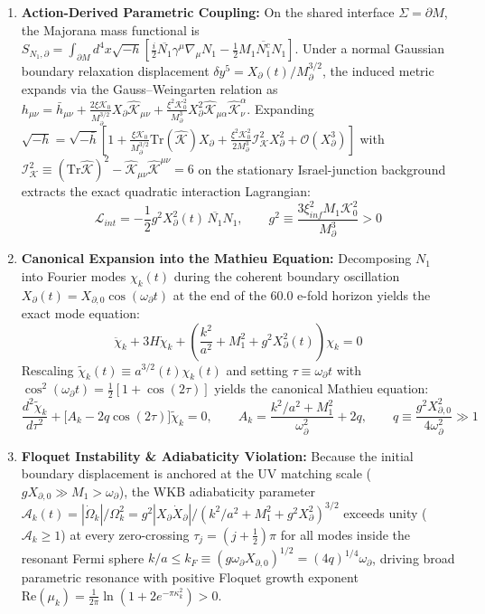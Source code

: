 \documentclass[aps,prd,onecolumn,superscriptaddress,nofootinbib,longbibliography,10pt]{revtex4-2}
\begin{document}
\begin{enumerate}
  
\item \textbf{Action-Derived Parametric Coupling:} On the shared interface \(\Sigma = \partial M\), the Majorana mass functional is \(S_{N_1,\partial} = \int_{\partial M} d^4x\sqrt{-h}\left[\frac{i}{2}\overline{N_1}\gamma^\mu\nabla_\mu N_1 - \frac{1}{2}M_1\overline{N_1^c}N_1\right]\). Under a normal Gaussian boundary relaxation displacement \(\delta y^5 = X_{\partial}(t)/M_{\partial}^{3/2}\), the induced metric expands via the Gauss–Weingarten relation as \(h_{\mu\nu} = \bar{h}_{\mu\nu} + \frac{2\xi\mathcal{K}_0}{M_{\partial}^{3/2}}X_{\partial}\hat{\mathcal{K}}_{\mu\nu} + \frac{\xi^2\mathcal{K}_0^2}{M_{\partial}^3}X_{\partial}^2\hat{\mathcal{K}}_{\mu\alpha}\hat{\mathcal{K}}_\nu^\alpha\). Expanding \(\sqrt{-h} = \sqrt{-\bar{h}}\left[1 + \frac{\xi\mathcal{K}_0}{M_{\partial}^{3/2}}\text{Tr}(\hat{\mathcal{K}})X_{\partial} + \frac{\xi^2\mathcal{K}_0^2}{2M_{\partial}^3}\mathcal{I}_{\mathcal{K}}^2 X_{\partial}^2 + \mathcal{O}(X_{\partial}^3)\right]\) with \(\mathcal{I}_{\mathcal{K}}^2 \equiv (\text{Tr}\hat{\mathcal{K}})^2 - \hat{\mathcal{K}}_{\mu\nu}\hat{\mathcal{K}}^{\mu\nu} = 6\) on the stationary Israel-junction background extracts the exact quadratic interaction Lagrangian:
  \[\mathcal{L}_{int} = -\frac{1}{2}g^2 X_{\partial}^2(t)\,\overline{N_1}N_1, \qquad g^2 \equiv \frac{3\xi_{inf}^2 M_1 \mathcal{K}_0^2}{M_{\partial}^3} > 0\]
  
\item \textbf{Canonical Expansion into the Mathieu Equation:} Decomposing \(N_1\) into Fourier modes \(\chi_k(t)\) during the coherent boundary oscillation \(X_{\partial}(t) = X_{\partial,0}\cos(\omega_{\partial} t)\) at the end of the \(60.0\) e-fold horizon yields the exact mode equation:
  \[\ddot{\chi}_k + 3H\dot{\chi}_k + \left(\frac{k^2}{a^2} + M_1^2 + g^2 X_{\partial}^2(t)\right)\chi_k = 0\]
  Rescaling \(\widetilde{\chi}_k(t) \equiv a^{3/2}(t)\chi_k(t)\) and setting \(\tau \equiv \omega_{\partial} t\) with \(\cos^2(\omega_{\partial} t) = \frac{1}{2}[1 + \cos(2\tau)]\) yields the canonical Mathieu equation:
  \[\frac{d^2\widetilde{\chi}_k}{d\tau^2} + \Big[A_k - 2q\cos(2\tau)\Big]\widetilde{\chi}_k = 0, \qquad A_k = \frac{k^2/a^2 + M_1^2}{\omega_{\partial}^2} + 2q, \qquad q \equiv \frac{g^2 X_{\partial,0}^2}{4\omega_{\partial}^2} \gg 1\]
  
\item \textbf{Floquet Instability \& Adiabaticity Violation:} Because the initial boundary displacement is anchored at the UV matching scale (\(g X_{\partial,0} \gg M_1 > \omega_{\partial}\)), the WKB adiabaticity parameter \(\mathcal{A}_k(t) = |\dot{\Omega}_k|/\Omega_k^2 = g^2|X_{\partial}\dot{X}_{\partial}|/(k^2/a^2 + M_1^2 + g^2 X_{\partial}^2)^{3/2}\) exceeds unity (\(\mathcal{A}_k \ge 1\)) at every zero-crossing \(\tau_j = (j + \frac{1}{2})\pi\) for all modes inside the resonant Fermi sphere \(k/a \le k_F \equiv (g\omega_{\partial} X_{\partial,0})^{1/2} = (4q)^{1/4}\omega_{\partial}\), driving broad parametric resonance with positive Floquet growth exponent \(\text{Re}(\mu_k) = \frac{1}{2\pi}\ln(1 + 2e^{-\pi\kappa_k^2}) > 0\).
  

\end{enumerate}
\end{document}
